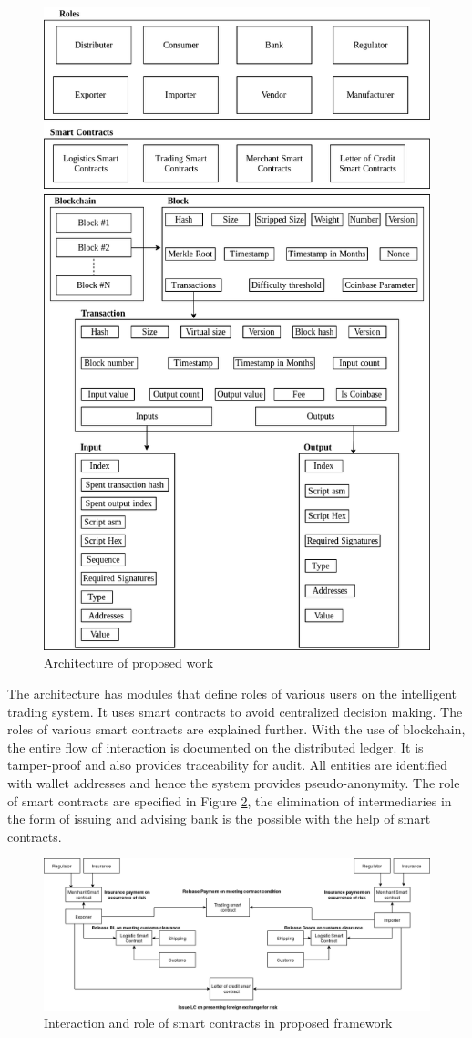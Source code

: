 \documentclass[num-refs]{wiley-article}
\begin{document}
\begin{figure}[!h]
\centering\includegraphics[width=0.6\linewidth]{blockML-logistic.png}
\caption{Architecture of proposed work}
\label{diag-arch}
\end{figure}

The architecture has modules that define roles of various users on the intelligent trading system. It uses smart contracts to avoid centralized decision making. The roles of various smart contracts are explained further. With the use of blockchain, the entire flow of interaction is documented on the distributed ledger. It is tamper-proof and also provides traceability for audit. All entities are identified with wallet addresses and hence the system provides pseudo-anonymity. The role of smart contracts are specified in Figure \ref{diag-sc}, the elimination of intermediaries in the form of issuing and advising bank is the possible with the help of smart contracts.


\begin{figure}[!h]
\centering\includegraphics[width=\linewidth]{export.png}
\caption{Interaction and role of smart contracts in proposed framework}
\label{diag-sc}
\end{figure}
\end{document}
